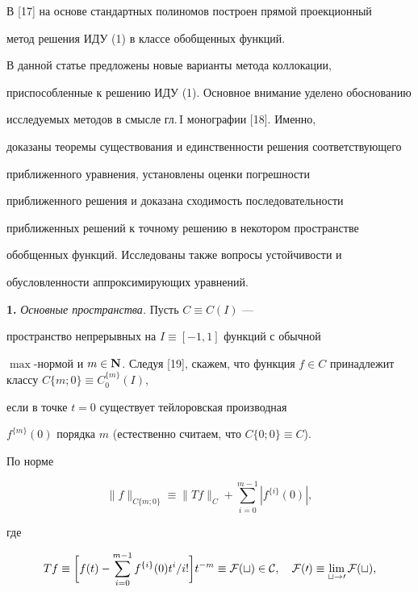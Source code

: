 В [17] на основе стандартных полиномов построен прямой проекционный 


метод решения ИДУ (1) в классе обобщенных функций. 


 


В данной статье предложены новые варианты метода коллокации, 


приспособленные к решению ИДУ (1). Основное внимание уделено обоснованию 


исследуемых методов в смысле гл.\,I монографии [18]. Именно, 


доказаны теоремы существования и единственности решения соответствующего 


приближенного уравнения, установлены оценки погрешности 


приближенного решения и доказана сходимость последовательности 


приближенных решений к точному решению в некотором пространстве 


обобщенных функций. Исследованы также вопросы устойчивости и 


обусловленности аппроксимирующих уравнений. 


\medskip 


 


{\bf 1.} {\it Основные пространства.} Пусть $C\equiv C(I)$ --- 


пространство непрерывных на $I\equiv[-1,1]$ функций с обычной 


$\max$-нормой и $m\in\bold N$. Следуя [19], скажем, что функция $f\in 


C$ принадлежит классу $C\{m;0\}\equiv C^{\{m\}}_0(I)$, 


если в точке $t=0$ существует тейлоровская производная 


$f^{\{m\}}(0)$ порядка $m$ (естественно считаем, что $C\{0;0\}\equiv C$). 


По норме 


$$ 


\|f\|_{C\{m;0\}}\equiv\|T f\|_C+\sum^{m-1}_{i=0}|f^{\{i\}}(0)|, 


$$ 


где 


$$ 


T f\equiv\bigg[f(t)-\sum^{m-1}_{i=0}f^{\{i\}}(0)t^i/i!\bigg]t^{-m} 


\equiv\cal F(t)\in C,\quad \cal F(0)\equiv\lim_{t\to0}\cal F(t), 


$$ 


